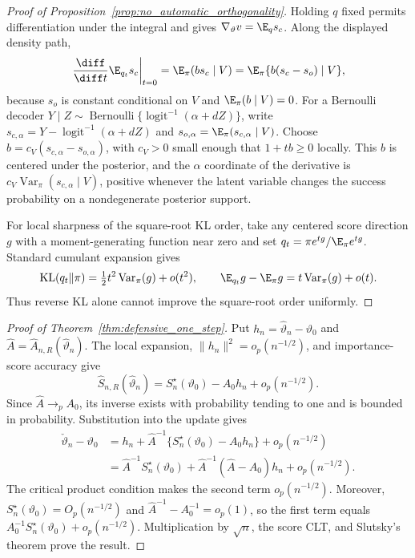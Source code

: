 \begin{proof}[Proof of Proposition~\ref{prop:no_automatic_orthogonality}]
Holding $q$ fixed permits differentiation under the integral and gives
$\nabla_\vartheta v=\E_qs_c$.  Along the displayed density path,
\[
 \left.\frac{\diff}{\diff t}\E_{q_t}s_c\right|_{t=0}
 =\E_\pi(b s_c\mid V)
 =\E_\pi\{b(s_c-s_o)\mid V\},
\]
because $s_o$ is constant conditional on $V$ and $\E_\pi(b\mid V)=0$.
For a Bernoulli decoder
$Y\mid Z\sim\operatorname{Bernoulli}\{\operatorname{logit}^{-1}
(\alpha+dZ)\}$, write
$s_{c,\alpha}=Y-\operatorname{logit}^{-1}(\alpha+dZ)$ and
$s_{o,\alpha}=\E_\pi(s_{c,\alpha}\mid V)$.  Choose
$b=c_V(s_{c,\alpha}-s_{o,\alpha})$, with $c_V>0$ small enough that
$1+tb\geq0$ locally.  This $b$ is centered under the posterior, and the
$\alpha$ coordinate of the derivative is
$c_V\operatorname{Var}_\pi(s_{c,\alpha}\mid V)$, positive whenever the latent
variable changes the success probability on a nondegenerate posterior
support.

For local sharpness of the square-root KL order, take any centered score
direction $g$ with a moment-generating function near zero and set
$q_t=\pi e^{tg}/\E_\pi e^{tg}$.  Standard cumulant expansion gives
\[
 \mathrm{KL}(q_t\|\pi)=\tfrac12t^2\operatorname{Var}_\pi(g)+o(t^2),
 \qquad
 \E_{q_t}g-\E_\pi g=t\operatorname{Var}_\pi(g)+o(t).
\]
Thus reverse KL alone cannot improve the square-root order uniformly.
\end{proof}

\begin{proof}[Proof of Theorem~\ref{thm:defensive_one_step}]
Put $h_n=\widehat\vartheta_n-\vartheta_0$ and
$\widehat A=\widehat A_{n,R}(\widehat\vartheta_n)$.  The local expansion,
$\|h_n\|^2=o_p(n^{-1/2})$, and importance-score accuracy give
\[
 \widehat S_{n,R}(\widehat\vartheta_n)
 =S_n^\star(\vartheta_0)-A_0h_n+o_p(n^{-1/2}).
\]
Since $\widehat A\to_pA_0$, its inverse exists with probability tending to
one and is bounded in probability.  Substitution into the update gives
\begin{align*}
 \check\vartheta_n-\vartheta_0
 &=h_n+\widehat A^{-1}
   \{S_n^\star(\vartheta_0)-A_0h_n\}+o_p(n^{-1/2})\\
 &=\widehat A^{-1}S_n^\star(\vartheta_0)
   +\widehat A^{-1}(\widehat A-A_0)h_n+o_p(n^{-1/2}).
\end{align*}
The critical product condition makes the second term $o_p(n^{-1/2})$.
Moreover, $S_n^\star(\vartheta_0)=O_p(n^{-1/2})$ and
$\widehat A^{-1}-A_0^{-1}=o_p(1)$, so the first term equals
$A_0^{-1}S_n^\star(\vartheta_0)+o_p(n^{-1/2})$.  Multiplication by
$\sqrt n$, the score CLT, and Slutsky's theorem prove the result.
\end{proof}

